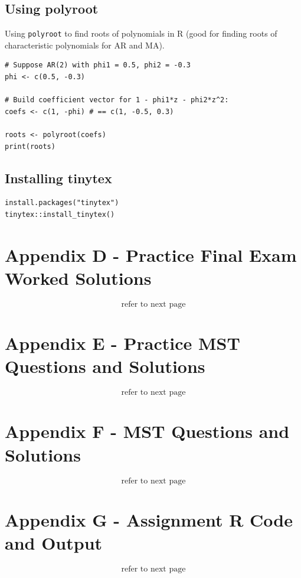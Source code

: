 \documentclass[11pt]{article}
\newcommand{\noi}{\noindent}
\begin{document}
\subsection{Using polyroot}
\noi Using \texttt{polyroot} to find roots of polynomials in R (good for finding roots of characteristic polynomials for AR and MA).
\begin{lstlisting}
# Suppose AR(2) with phi1 = 0.5, phi2 = -0.3
phi <- c(0.5, -0.3)

# Build coefficient vector for 1 - phi1*z - phi2*z^2:
coefs <- c(1, -phi) # == c(1, -0.5, 0.3)

roots <- polyroot(coefs)
print(roots)
\end{lstlisting}

\subsection{Installing tinytex}
\begin{lstlisting}
install.packages("tinytex")
tinytex::install_tinytex()
\end{lstlisting}

\newpage

\section{Appendix D - Practice Final Exam Worked Solutions}
$$\text{refer to next page}$$


\section{Appendix E - Practice MST Questions and Solutions}
$$\text{refer to next page}$$


\section{Appendix F - MST Questions and Solutions}
$$\text{refer to next page}$$


\section{Appendix G - Assignment R Code and Output}
$$\text{refer to next page}$$

\end{document}
